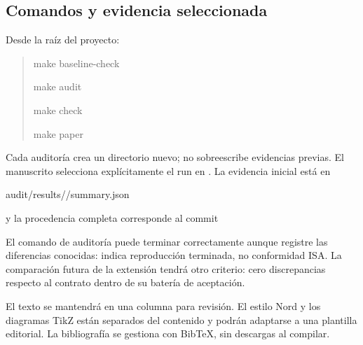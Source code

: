 \subsection{Comandos y evidencia seleccionada}
Desde la raíz del proyecto:
\begin{quote}\ttfamily\small
make baseline-check\par
make audit\par
make check\par
make paper
\end{quote}
Cada auditoría crea un directorio nuevo; no sobreescribe evidencias previas.
El manuscrito selecciona explícitamente el run en .
La evidencia inicial está en\par
{\small\ttfamily audit/results/\AuditRun/summary.json\par}
y la procedencia completa corresponde al commit\par
{\small\ttfamily\CoreCommit\par}

El comando de auditoría puede terminar correctamente aunque registre las
diferencias conocidas: indica reproducción terminada, no conformidad ISA.
La comparación futura de la extensión tendrá otro criterio: cero discrepancias
respecto al contrato dentro de su batería de aceptación.

El texto se mantendrá en una columna para revisión. El estilo Nord y los
diagramas TikZ están separados del contenido y podrán adaptarse a una plantilla
editorial. La bibliografía se gestiona con BibTeX, sin descargas al compilar.
